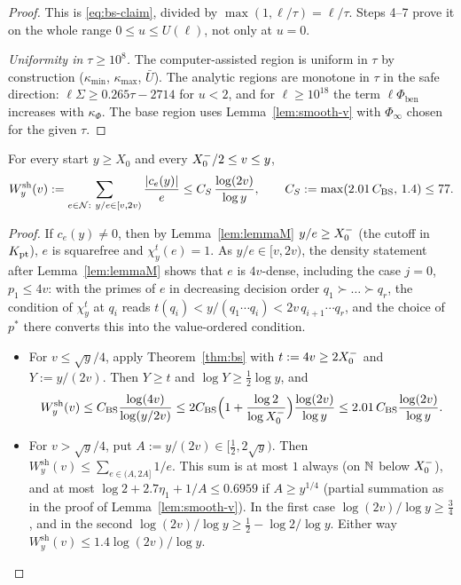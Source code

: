 \begin{proof}
This is \eqref{eq:bs-claim}, divided by $\max(1,\ell/\tau)=\ell/\tau$. Steps 4--7 prove it on the whole range
$0\le u\le U(\ell)$, not only at $u=0$.

\emph{Uniformity in $\tau\ge10^8$.} The computer-assisted region is uniform in $\tau$ by construction ($\kappa_{\min}$,
$\kappa_{\max}$, $\bar U$). The analytic regions are monotone in $\tau$ in the safe direction: $\ell\Sigma\ge0.265\tau-2714$ for
$u<2$, and for $\ell\ge10^{18}$ the term $\ell\Phi_{\mathrm{ben}}$ increases with $\kappa_\Phi$. The base region uses
Lemma~\ref{lem:smooth-v} with $\Phi_\infty$ chosen for the given $\tau$.
\end{proof}

\begin{corollary}\label{cor:saias}
For every start $y\ge X_0$ and every $X_0^{-}/2\le v\le y$,
\[
  W^{\mathrm{sh}}_y(v):=\sum_{e\in\NN:\ y/e\in[v,2v)}\frac{|c_e(y)|}e\le C_S\,\frac{\log(2v)}{\log y},\qquad
  C_S:=\max(2.01\,C_{\mathrm{BS}},\,1.4)\le77 .
\]
\end{corollary}

\begin{proof}
If $c_e(y)\ne0$, then by Lemma~\ref{lem:lemmaM} $y/e\ge X_0^{-}$ (the cutoff in $K_{\mathrm{pt}}$), $e$ is squarefree and
$\chi^t_y(e)=1$. As $y/e\in[v,2v)$, the density statement after Lemma~\ref{lem:lemmaM} shows that $e$ is $4v$-dense,
including the case $j=0$, $p_1\le4v$: with the primes of $e$ in decreasing decision order $q_1\succ\dots\succ q_r$, the
condition of $\chi^t_y$ at $q_i$ reads $t(q_i)<y/(q_1\cdots q_i)<2v\,q_{i+1}\cdots q_r$, and the choice of $p^*$ there converts
this into the value-ordered condition.
\begin{itemize}
\item For $v\le\sqrt y/4$, apply Theorem~\ref{thm:bs} with $t:=4v\ge2X_0^{-}$ and $Y:=y/(2v)$. Then $Y\ge t$ and
  $\log Y\ge\frac12\log y$, and
  \[
    W^{\mathrm{sh}}_y(v)\le C_{\mathrm{BS}}\frac{\log(4v)}{\log(y/2v)}\le2C_{\mathrm{BS}}\Big(1+\frac{\log2}{\log X_0^{-}}\Big)
    \frac{\log(2v)}{\log y}\le2.01\,C_{\mathrm{BS}}\frac{\log(2v)}{\log y}.
  \]
\item For $v>\sqrt y/4$, put $A:=y/(2v)\in[\frac12,2\sqrt y)$. Then $W^{\mathrm{sh}}_y(v)\le\sum_{e\in(A,2A]}1/e$.
  This sum is at most $1$ always (on $\mathbb{N}$ below $X_0^{-}$), and at most $\log2+2.7\eta_1+1/A\le0.6959$ if $A\ge y^{1/4}$
  (partial summation as in the proof of Lemma~\ref{lem:smooth-v}). In the
  first case $\log(2v)/\log y\ge\frac34$, and in the second $\log(2v)/\log y\ge\frac12-\log2/\log y$. Either way
  $W^{\mathrm{sh}}_y(v)\le1.4\log(2v)/\log y$.\qedhere
\end{itemize}
\end{proof}
